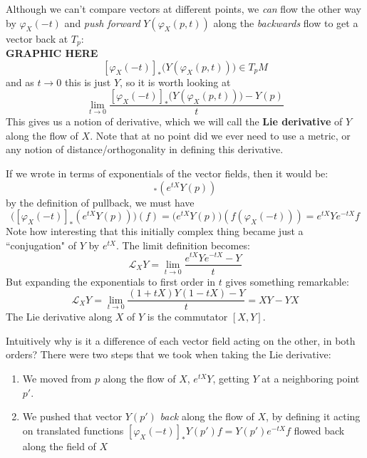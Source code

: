 \documentclass[../master.tex]{subfiles}
\begin{document}
		Although we can't compare vectors at different points, we \emph{can} flow the other way by $\varphi_{X}(-t)$ and \emph{push forward} $Y(\varphi_X (p,t))$ along the \emph{backwards} flow to get a vector back at $T_p$:
\\		\textbf{GRAPHIC HERE}
		\begin{equation}\label{eq:pushforward_backwards}
			[\varphi_X(-t)]_* \big(Y(\varphi_X(p, t))\big) \in T_pM
		\end{equation}
		and as $t \rightarrow 0$ this is just $Y$, so it is worth looking at
		\begin{equation*}
			\lim_{t \rightarrow 0} \frac{[\varphi_X(-t)]_* \big(Y(\varphi_X(p, t))\big)-Y(p)}{t}
		\end{equation*}
		This gives us a notion of derivative, which we will call the \textbf{Lie derivative} of $Y$ along the flow of $X$. Note that at no point did we ever need to use a metric, or any notion of distance/orthogonality in defining this derivative.
		 
		If we wrote \label{eq:pushforward_backwards} in terms of exponentials of the vector fields, then it would be:
		\begin{equation*}
			 [\varphi_X(-t)]_* (e^{tX} Y(p))
		\end{equation*}
		by the definition of pullback, we must have 
		\begin{equation*}
			\Big([\varphi_X(-t)]_* (e^{tX} Y(p)) \Big) (f) = \big(e^{tX} Y(p) \big) (f(\varphi_X(-t))) = e^{tX} Y e^{-tX} f
		\end{equation*}
		Note how interesting that this initially complex thing became just a ``conjugation" of $Y$ by $e^{tX}$. The limit definition becomes:
		\begin{equation}
			\mathcal L_X Y = \lim_{t \rightarrow 0} 
			\frac{e^{tX} Y e^{-tX} - Y}{t}
		\end{equation}
		But expanding the exponentials to first order in $t$ gives something remarkable:
		\begin{equation}
			\mathcal L_X Y = \lim_{t \rightarrow 0} \frac{(1+tX)Y(1-tX) - Y}{t} = XY-YX
		\end{equation}
		The Lie derivative along $X$ of $Y$ is the commutator $[X,Y]$. 
		
		Intuitively why is it a difference of each vector field acting on the other, in both orders? There were two steps that we took when taking the Lie derivative:
		\begin{enumerate}
			\item We moved from $p$ along the flow of $X$, $e^{tX} Y$, getting $Y$ at a neighboring point $p'$.
			\item We pushed that vector $Y(p')$ \emph{back} along the flow of $X$, by defining it acting on translated functions $[\varphi_X(-t)]_* Y(p') f = Y(p') e^{-tX} f$ flowed back along the field of $X$
		\end{enumerate}
		
\end{document}
